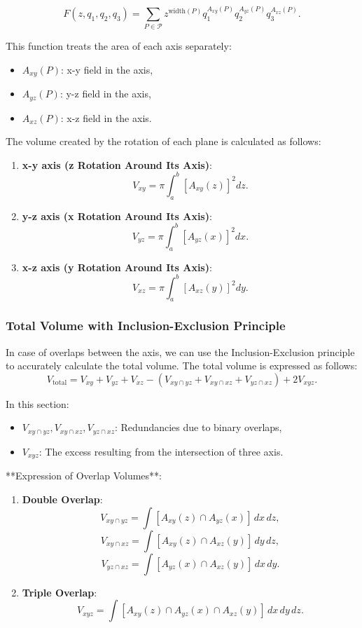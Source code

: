 \documentclass{article}
\begin{document}
\[
F(z, q_1, q_2, q_3) = \sum_{P \in \mathcal{P}} z^{\text{width}(P)} q_1^{A_{xy}(P)} q_2^{A_{yz}(P)} q_3^{A_{xz}(P)}.
\]

This function treats the area of each axis separately:
\begin{itemize}
    \item \( A_{xy}(P) \): x-y field in the axis,
    \item \( A_{yz}(P) \): y-z field in the axis,
    \item \( A_{xz}(P) \): x-z field in the axis.
\end{itemize}

The volume created by the rotation of each plane is calculated as follows:
\begin{enumerate}
    \item \textbf{x-y axis (z Rotation Around Its Axis)}:
    \[
    V_{xy} = \pi \int_{a}^{b} \left[A_{xy}(z)\right]^2 dz.
    \]
    \item \textbf{y-z axis (x Rotation Around Its Axis)}:
    \[
    V_{yz} = \pi \int_{a}^{b} \left[A_{yz}(x)\right]^2 dx.
    \]
    \item \textbf{x-z axis (y Rotation Around Its Axis)}:
    \[
    V_{xz} = \pi \int_{a}^{b} \left[A_{xz}(y)\right]^2 dy.
    \]
\end{enumerate}

\subsubsection{Total Volume with Inclusion-Exclusion Principle}

In case of overlaps between the axis, we can use the Inclusion-Exclusion principle to accurately calculate the total volume. The total volume is expressed as follows:
\[
V_{\text{total}} = V_{xy} + V_{yz} + V_{xz} - \left(V_{xy \cap yz} + V_{xy \cap xz} + V_{yz \cap xz}\right) + 2V_{xyz}.
\]

In this section:
\begin{itemize}
    \item \( V_{xy \cap yz}, V_{xy \cap xz}, V_{yz \cap xz} \): Redundancies due to binary overlaps,
    \item \( V_{xyz} \): The excess resulting from the intersection of three axis.
\end{itemize}

**Expression of Overlap Volumes**:
\begin{enumerate}
    \item \textbf{Double Overlap}:
    \[
    V_{xy \cap yz} = \int \left[A_{xy}(z) \cap A_{yz}(x)\right] \, dx \, dz,
    \]
    \[
    V_{xy \cap xz} = \int \left[A_{xy}(z) \cap A_{xz}(y)\right] \, dy \, dz,
    \]
    \[
    V_{yz \cap xz} = \int \left[A_{yz}(x) \cap A_{xz}(y)\right] \, dx \, dy.
    \]
    \item \textbf{Triple Overlap}:
    \[
    V_{xyz} = \int \left[A_{xy}(z) \cap A_{yz}(x) \cap A_{xz}(y)\right] \, dx \, dy \, dz.
    \]
\end{enumerate}
\end{document}
